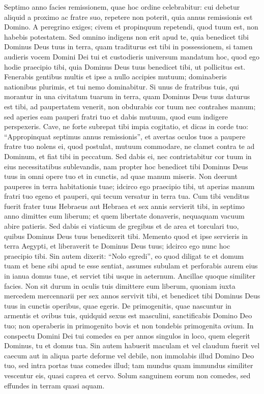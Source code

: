 \begin{biblechapter} 
\verse Septimo anno facies remissionem, 
\verse quae hoc ordine celebrabitur: cui debetur aliquid a proximo ac fratre suo, repetere non poterit, quia annus remissionis est Domino.  
\verse A peregrino exiges; civem et propinquum repetendi, quod tuum est, non habebis potestatem. 
\verse Sed omnino indigens non erit apud te, quia benedicet tibi Dominus Deus tuus in terra, quam traditurus est tibi in possessionem, 
\verse si tamen audieris vocem Domini Dei tui et custodieris universum mandatum hoc, quod ego hodie praecipio tibi, 
\verse quia Dominus Deus tuus benedicet tibi, ut pollicitus est. Fenerabis gentibus multis et ipse a nullo accipies mutuum; dominaberis nationibus plurimis, et tui nemo dominabitur. 
\verse Si unus de fratribus tuis, qui morantur in una civitatum tuarum in terra, quam Dominus Deus tuus daturus est tibi, ad paupertatem venerit, non obdurabis cor tuum nec contrahes manum; 
\verse sed aperies eam pauperi fratri tuo et dabis mutuum, quod eum indigere perspexeris. 
\verse Cave, ne forte subrepat tibi impia cogitatio, et dicas in corde tuo: “Appropinquat septimus annus remissionis”, et avertas oculos tuos a paupere fratre tuo nolens ei, quod postulat, mutuum commodare, ne clamet contra te ad Dominum, et fiat tibi in peccatum. 
\verse Sed dabis ei, nec contristabitur cor tuum in eius necessitatibus sublevandis, nam propter hoc benedicet tibi Dominus Deus tuus in omni opere tuo et in cunctis, ad quae manum miseris. 
\verse Non deerunt pauperes in terra habitationis tuae; idcirco ego praecipio tibi, ut aperias manum fratri tuo egeno et pauperi, qui tecum versatur in terra tua. 
\verse Cum tibi venditus fuerit frater tuus Hebraeus aut Hebraea et sex annis servierit tibi, in septimo anno dimittes eum liberum; 
\verse et quem libertate donaveris, nequaquam vacuum abire patieris. 
\verse Sed dabis ei viaticum de gregibus et de area et torculari tuo, quibus Dominus Deus tuus benedixerit tibi.  
\verse Memento quod et ipse servieris in terra Aegypti, et liberaverit te Dominus Deus tuus; idcirco ego nunc hoc praecipio tibi. 
\verse Sin autem dixerit: “Nolo egredi”, eo quod diligat te et domum tuam et bene sibi apud te esse sentiat,  
\verse assumes subulam et perforabis aurem eius in ianua domus tuae, et serviet tibi usque in aeternum. Ancillae quoque similiter facies. 
\verse Non sit durum in oculis tuis dimittere eum liberum, quoniam iuxta mercedem mercennarii per sex annos servivit tibi, et benedicet tibi Dominus Deus tuus in cunctis operibus, quae egeris. 
\verse De primogenitis, quae nascuntur in armentis et ovibus tuis, quidquid sexus est masculini, sanctificabis Domino Deo tuo; non operaberis in primogenito bovis et non tondebis primogenita ovium. 
\verse In conspectu Domini Dei tui comedes ea per annos singulos in loco, quem elegerit Dominus, tu et domus tua. 
\verse Sin autem habuerit maculam et vel claudum fuerit vel caecum aut in aliqua parte deforme vel debile, non immolabis illud Domino Deo tuo, 
\verse sed intra portas tuas comedes illud; tam mundus quam immundus similiter vescentur eis, quasi caprea et cervo. 
\verse Solum sanguinem eorum non comedes, sed effundes in terram quasi aquam. 
\end{biblechapter}

